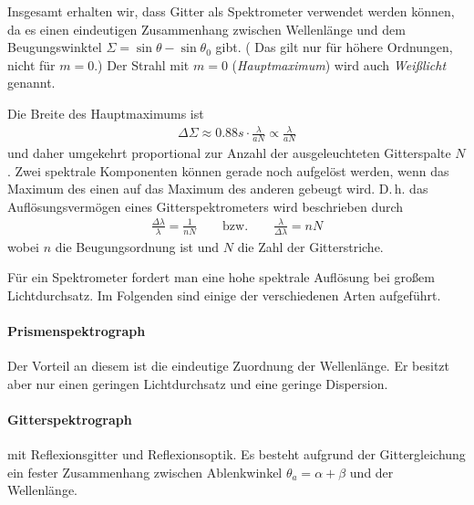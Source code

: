 \begin{enumerate}[a)]
Insgesamt erhalten wir, dass Gitter als Spektrometer verwendet werden
können, da es einen eindeutigen Zusammenhang zwischen Wellenlänge und
dem Beugungswinktel $\Sigma = \sin\theta-\sin\theta_0$ gibt.
( Das gilt nur für höhere Ordnungen, nicht für $m=0$.)
Der Strahl mit $m=0$ (\emph{Hauptmaximum}) wird
auch \emph{Weißlicht} genannt.

Die Breite des Hauptmaximums ist
\begin{gather*}
  \Delta\Sigma 
  \approx \num{0,88}s\cdot \frac{\lambda}{aN} 
  \propto \frac{\lambda}{aN} 
\end{gather*}
und daher umgekehrt proportional zur Anzahl der ausgeleuchteten
Gitterspalte $N$.
Zwei spektrale Komponenten können gerade noch aufgelöst werden, wenn
das Maximum des einen auf das Maximum des anderen gebeugt wird.
D.\,h. das Auflösungsvermögen eines Gitterspektrometers wird
beschrieben durch
\begin{gather*}
  \frac{\Delta\lambda}{\lambda} = \frac{1}{nN}
  \qquad\text{bzw.}\qquad
  \frac{\lambda}{\Delta\lambda} = nN
\end{gather*}
wobei $n$ die Beugungsordnung ist 
und $N$ die Zahl der Gitterstriche.

\end{enumerate}


Für ein Spektrometer fordert man eine hohe spektrale Auflösung bei
großem Lichtdurchsatz.
Im Folgenden sind einige der verschiedenen Arten aufgeführt.

\paragraph{Prismenspektrograph}
Der Vorteil an diesem ist die eindeutige Zuordnung der Wellenlänge. 
Er besitzt aber nur einen geringen Lichtdurchsatz und eine geringe
Dispersion.

\paragraph{Gitterspektrograph}
mit Reflexionsgitter und Reflexionsoptik. 
Es besteht aufgrund der Gittergleichung ein fester Zusammenhang
zwischen Ablenkwinkel $\theta_a=\alpha+\beta$ und der Wellenlänge.

